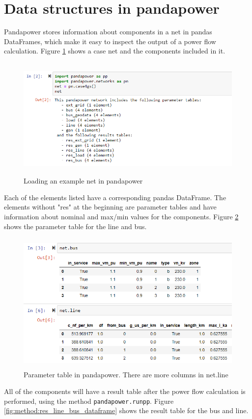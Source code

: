 \documentclass[class=book, crop=false]{standalone}
\begin{document}
\section{Data structures in pandapower}

Pandapower stores information about components in a net in pandas DataFrames, which make it easy to inspect the output of a power flow calculation. Figure \ref{fig:method:loading_example_net} shows a case net and the components included in it. 

\begin{figure}[H]
    \center
    \includegraphics[height=6cm, width=12cm]{figures/case4g_show_net.PNG}
    \caption[size = 9]{Loading an example net in pandapower}
    \label{fig:method:loading_example_net}
\end{figure}
Each of the elements listed have a corresponding pandas DataFrame. The elements without "res" at the beginning are parameter tables and have information about nominal and max/min values for the components. Figure \ref{fig:method:line_bus_dataframe} shows the parameter table for the line and bus.

\begin{figure}[H]
    \includegraphics[height=7cm, width=13.5cm]{figures/case4g_line_bus.PNG}
    \caption[size = 9]{Parameter table in pandapower. There are more columns in net.line}
    \label{fig:method:line_bus_dataframe}
\end{figure}
All of the components will have a result table after the power flow calculation is performed, using the method \texttt{pandapower.runpp}. Figure \ref{fig:method:res_line_bus_dataframe} shows the result table for the bus and line.
\end{document}

